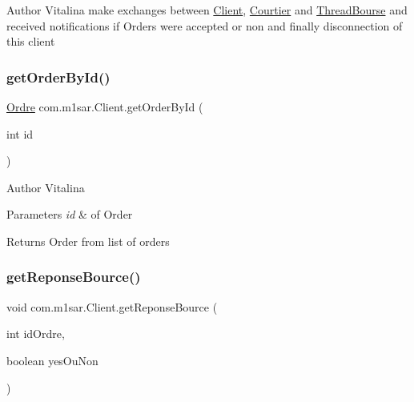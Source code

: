 \begin{DoxyAuthor}{Author}
Vitalina make exchanges between \hyperlink{classcom_1_1m1sar_1_1_client}{Client}, \hyperlink{classcom_1_1m1sar_1_1_courtier}{Courtier} and \hyperlink{classcom_1_1m1sar_1_1_thread_bourse}{Thread\+Bourse} and received notifications if Orders were accepted or non and finally disconnection of this client 
\end{DoxyAuthor}
\mbox{\label{classcom_1_1m1sar_1_1_client_a29230c6248c0b37d1faeb254270f0001}} 
\subsubsection{\texorpdfstring{get\+Order\+By\+Id()}{getOrderById()}}
{\footnotesize\ttfamily \hyperlink{classcom_1_1m1sar_1_1_ordre}{Ordre} com.\+m1sar.\+Client.\+get\+Order\+By\+Id (\begin{DoxyParamCaption}\item[{int}]{id }\end{DoxyParamCaption})}

\begin{DoxyAuthor}{Author}
Vitalina 
\end{DoxyAuthor}

\begin{DoxyParams}{Parameters}
{\em id} & of Order \\
\hline
\end{DoxyParams}
\begin{DoxyReturn}{Returns}
Order from list of orders 
\end{DoxyReturn}
\mbox{\label{classcom_1_1m1sar_1_1_client_a78ef39501ca822bcd7df390bead5baae}} 
\subsubsection{\texorpdfstring{get\+Reponse\+Bource()}{getReponseBource()}}
{\footnotesize\ttfamily void com.\+m1sar.\+Client.\+get\+Reponse\+Bource (\begin{DoxyParamCaption}\item[{int}]{id\+Ordre,  }\item[{boolean}]{yes\+Ou\+Non }\end{DoxyParamCaption})}

